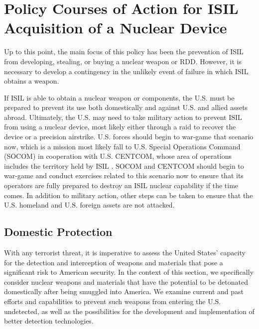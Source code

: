 \documentclass{report}
\begin{document}
\chapter{Policy Courses of Action for ISIL Acquisition of a Nuclear Device}




Up to this point, the main focus of this policy has been the prevention of ISIL from developing, stealing, or buying a nuclear weapon or RDD.  However, it is necessary to develop a contingency in the unlikely event of failure in which ISIL obtains a weapon.  



If ISIL is able to obtain a nuclear weapon or components, the U.S. must be prepared to prevent its use both domestically and against U.S. and allied assets abroad. Ultimately, the U.S. may need to take military action to prevent ISIL from using a nuclear device, most likely either through a raid to recover the device or a precision airstrike. U.S. forces should begin to war-game that scenario now, which is a mission most likely fall to U.S. Special Operations Command (SOCOM) in cooperation with U.S. CENTCOM, whose area of operations includes the territory held by ISIL \cite{U.S.DepartmentofDefense}. SOCOM and CENTCOM should begin to war-game and conduct exercises related to this scenario now to ensure that its operators are fully prepared to destroy an ISIL nuclear capability if the time comes. In addition to military action, other steps can be taken to ensure that the U.S. homeland and U.S. foreign assets are not attacked.


\section{Domestic Protection} \label{sec:domestic_protection}

With any terrorist threat, it is imperative to assess the United States' capacity for the detection and interception of weapons and materials that pose a significant risk to American security. In the context of this section, we specifically consider nuclear weapons and materials that have the potential to be detonated domestically after being smuggled into America. We examine current and past efforts and capabilities to prevent such weapons from entering the U.S. undetected, as well as the possibilities for the development and implementation of better detection technologies. 
\end{document}
